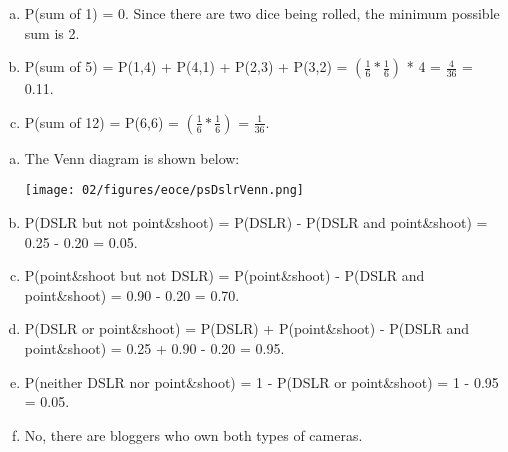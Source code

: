 
{
\begin{enumerate}[(a)]
\item P(sum of 1) = 0. Since there are two dice being rolled, the minimum possible sum is 2.
\item P(sum of 5) = P(1,4) +  P(4,1) + P(2,3) + P(3,2) = $\left( \frac{1}{6} * \frac{1}{6} \right)$ * 4 = $\frac{4}{36}$ =  0.11.
\item P(sum of 12) = P(6,6) = $\left( \frac{1}{6} * \frac{1}{6} \right)$ = $\frac{1}{36}$.
\end{enumerate}
}


{
\begin{enumerate}[(a)]
\item The Venn diagram is shown below:
\begin{center}
\texttt{[image: 02/figures/eoce/psDslrVenn.png]}
\end{center}
\item P(DSLR but not point\&shoot) = P(DSLR) - P(DSLR and point\&shoot) = 0.25 - 0.20 = 0.05.
\item P(point\&shoot but not DSLR) = P(point\&shoot) - P(DSLR and point\&shoot) = 0.90 - 0.20 = 0.70.
\item P(DSLR or point\&shoot) = P(DSLR) + P(point\&shoot) - P(DSLR and point\&shoot) = 0.25 + 0.90 - 0.20 = 0.95.
\item P(neither DSLR nor point\&shoot) = 1 - P(DSLR or point\&shoot)  = 1 - 0.95 = 0.05.
\item No, there are bloggers who own both types of cameras.
\end{enumerate}
}\label{cameras}

